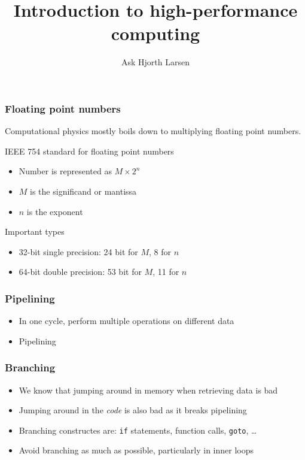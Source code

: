 \documentclass{beamer}
\author{Ask Hjorth Larsen}
\begin{document}
\title{Introduction to high-performance computing}

\begin{frame}
  \maketitle
\end{frame}

\begin{frame}
  \frametitle{Floating point numbers}
  Computational physics mostly boils down to multiplying floating point numbers.
  \begin{block}{IEEE 754 standard for floating point numbers}
    \begin{itemize}
    \item Number is represented as $M \times 2^n$
    \item $M$ is the significand or mantissa
    \item $n$ is the exponent
    \end{itemize}
  \end{block}
  \begin{block}{Important types}
    \begin{itemize}
    \item 32-bit single precision: 24 bit for $M$, 8 for $n$
    \item 64-bit double precision: 53 bit for $M$, 11 for $n$
    \end{itemize}
  \end{block}
\end{frame}


\begin{frame}
  \frametitle{Pipelining}
  \begin{itemize}
  \item In one cycle, perform multiple operations on different data
  \item Pipelining
  \end{itemize}
\end{frame}

\begin{frame}
  \frametitle{Branching}
  \begin{itemize}
  \item We know that jumping around in memory when retrieving data is bad
  \item Jumping around in the \emph{code} is also bad as it breaks pipelining
  \item Branching constructes are: \texttt{if} statements, function calls, \texttt{goto}, \ldots
  \item Avoid branching as much as possible, particularly in inner loops
  \end{itemize}
\end{frame}
\end{document}
